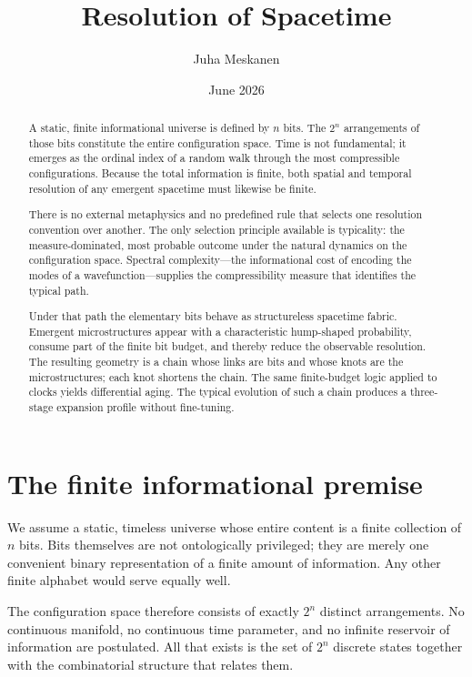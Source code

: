 \documentclass[11pt]{article}
\title{Resolution of Spacetime}
\author{Juha Meskanen}
\date{June 2026}
\begin{document}
\maketitle

\begin{abstract}
A static, finite informational universe is defined by \(n\) bits.  
The \(2^n\) arrangements of those bits constitute the entire 
configuration space. Time is not fundamental; it emerges as the 
ordinal index of a random walk through the most compressible 
configurations. Because the total information is finite, both 
spatial and temporal resolution of any emergent spacetime must 
likewise be finite.  

There is no external metaphysics and no predefined rule that 
selects one resolution convention over another. The only selection 
principle available is typicality: the measure-dominated, most 
probable outcome under the natural dynamics on the configuration 
space. Spectral complexity---the informational cost of encoding 
the modes of a wavefunction---supplies the compressibility measure 
that identifies the typical path.  

Under that path the elementary bits behave as structureless spacetime 
fabric. Emergent microstructures appear with a characteristic 
hump-shaped probability, consume part of the finite bit budget, and 
thereby reduce the observable resolution. The resulting geometry is 
a chain whose links are bits and whose knots are the microstructures; 
each knot shortens the chain. The same finite-budget logic applied 
to clocks yields differential aging. The typical evolution of such a 
chain produces a three-stage expansion profile without fine-tuning.
\end{abstract}

\section{The finite informational premise}

We assume a static, timeless universe whose entire content is a 
finite collection of \(n\) bits. Bits themselves are not 
ontologically privileged; they are merely one convenient binary 
representation of a finite amount of information. Any other finite 
alphabet would serve equally well.

The configuration space therefore consists of exactly \(2^n\) 
distinct arrangements. No continuous manifold, no continuous time 
parameter, and no infinite reservoir of information are postulated. 
All that exists is the set of \(2^n\) discrete states together with 
the combinatorial structure that relates them.
\end{document}
